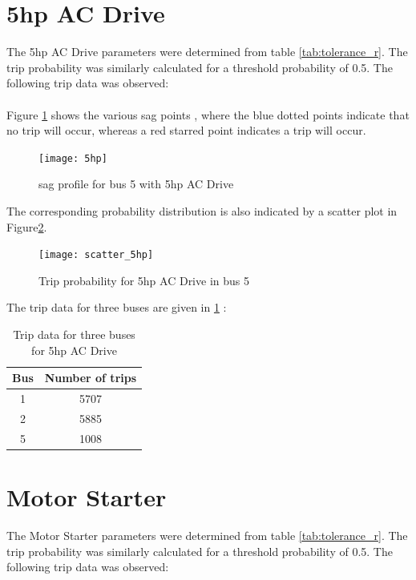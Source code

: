 \documentclass[17pt,a4paper]{extreport}
\begin{document}
\newpage \section[5hp AC Drive]{5hp AC Drive}
 The 5hp AC Drive parameters were determined from table \ref{tab:tolerance_r}. The trip probability was similarly calculated for a threshold probability of 0.5. The following trip data was observed: 
	 \paragraph{} Figure \ref{fig:5hp_sag_5} shows the various sag points , where the blue dotted points indicate that no trip will occur, whereas a red starred point indicates a trip will occur.
	\begin{figure}[!h]
		\texttt{[image: 5hp]}
		\caption{sag profile for bus 5 with 5hp AC Drive}
		\label{fig:5hp_sag_5}
	\end{figure}
	The corresponding probability distribution is also indicated by a scatter plot in Figure\ref{fig:scatter_5hp_5}.
	\begin{figure}[!h]
	\texttt{[image: scatter\_5hp]}
	\caption{Trip probability for 5hp AC Drive in bus 5}
	\label{fig:scatter_5hp_5}
\end{figure}	
The trip data for three buses are given in \ref{tab:5hp_res} :
 \begin{center}
 \begin{table}
 \centering
 \begin{tabular}{|c|c|}
 \hline 
 Bus & Number of trips \\ \hline
 1 & 5707 \\ \hline
 2 & 5885 \\ \hline
 5 & 1008	\\ \hline
 
 \end{tabular}
  \caption{Trip data for three buses for 5hp AC Drive}
 \label{tab:5hp_res}
 \end{table}

 \end{center}

\section[Motor Starter]{Motor Starter}
 The Motor Starter parameters were determined from table \ref{tab:tolerance_r}. The trip probability was similarly calculated for a threshold probability of 0.5. The following trip data was observed: 
\end{document}
